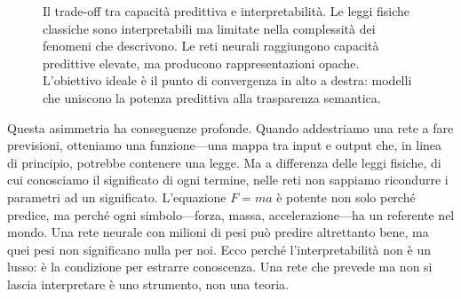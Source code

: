 \begin{figure}[htbp]
    \centering
    \caption{Il trade-off tra capacità predittiva e interpretabilità. Le leggi fisiche classiche sono interpretabili ma limitate nella complessità dei fenomeni che descrivono. Le reti neurali raggiungono capacità predittive elevate, ma producono rappresentazioni opache. L'obiettivo ideale è il punto di convergenza in alto a destra: modelli che uniscono la potenza predittiva alla trasparenza semantica.}
    \label{fig:tradeoff_prediction_interpretability}
\end{figure}
Questa asimmetria ha conseguenze profonde. Quando addestriamo una rete a fare previsioni, otteniamo una funzione—una mappa tra input e output che, in linea di principio, potrebbe contenere una legge. Ma a differenza delle leggi fisiche, di cui conosciamo il significato di ogni termine, nelle reti non sappiamo ricondurre i parametri ad un significato. L'equazione $F = ma$ è potente non solo perché predice, ma perché ogni simbolo—forza, massa, accelerazione—ha un referente nel mondo. Una rete neurale con milioni di pesi può predire altrettanto bene, ma quei pesi non significano nulla per noi.
Ecco perché l'interpretabilità non è un lusso: è la condizione per estrarre conoscenza. Una rete che prevede ma non si lascia interpretare è uno strumento, non una teoria.
